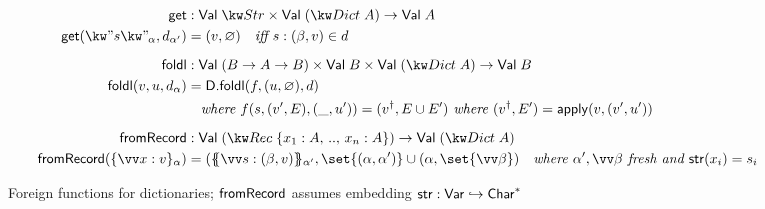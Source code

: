 \begin{figure}
\begin{align*}
   \dictGet &: \Val{\tyStr} \times \Val{(\tyDict{A})} \to \Val{A}
   \\
   \dictGet(\annStr{s}{\alpha}, d_{\alpha'}) &= (v, \varnothing)
   \quad\textit{iff }\bind{s}{(\beta, v)} \in d
   \\[2mm]
   \dictFoldl &: \Val{(\tyFun{B}{\tyFun{A}{B}})} \times \Val{B} \times \Val{(\tyDict{A})} \to \Val{B}
   \\
   \dictFoldl(v, u, d_\alpha) &= \Dfoldl(f, (u, \varnothing), d)
   \\
   &\quad\textit{where }
   f(s, (v', E), (\_, u')) = (v^\dagger, E \cup E')\textit{ where }(v^\dagger, E') = \apply(v, (v', u'))
   \\[2mm]
   \dictFromRecord &: \Val{(\tyRec{\seqRange{\bind{x_1}{A}}{\bind{x_n}{A}}})} \to \Val{(\tyDict{A})}
   \\
   \dictFromRecord(\annRec{\seq{\bind{x}{v}}}{\alpha})
   &=
   (\annDict{\seq{\bind{s}{(\beta, v)}}}{\alpha'},
    \set{(\alpha, \alpha')} \cup (\alpha, \set{\seq{\beta}})
   \quad\textit{where }\alpha', \seq{\beta}\textit{ fresh and }\str(x_i) = s_i
\end{align*}
\caption{Foreign functions for dictionaries; $\textup{\textsf{fromRecord}}$ assumes embedding $\textup{\textsf{str}}: \textup{\textsf{Var}} \hookrightarrow \textup{\textsf{Char}}^*$}
\end{figure}
